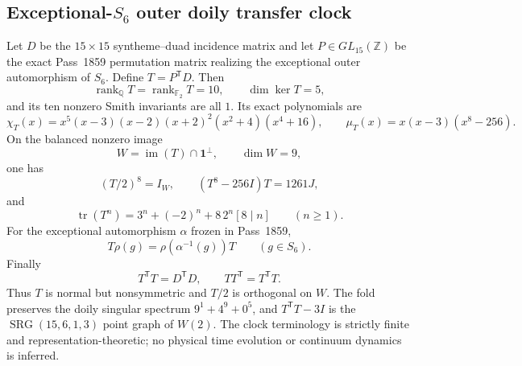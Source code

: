 \subsection{Exceptional-$S_6$ outer doily transfer clock}
Let $D$ be the $15\times15$ syntheme--duad incidence matrix and let
$P\in GL_{15}(\mathbb Z)$ be the exact Pass~1859 permutation matrix realizing
the exceptional outer automorphism of $S_6$. Define $T=P^{\mathsf T}D$.
Then
\[
 \operatorname{rank}_{\mathbb Q}T=
 \operatorname{rank}_{\mathbb F_2}T=10,
 \qquad \dim\ker T=5,
\]
and its ten nonzero Smith invariants are all $1$. Its exact polynomials are
\[
 \chi_T(x)=x^5(x-3)(x-2)(x+2)^2(x^2+4)(x^4+16),
 \qquad
 \mu_T(x)=x(x-3)(x^8-256).
\]
On the balanced nonzero image
\[
 W=\operatorname{im}(T)\cap\mathbf1^\perp,
 \qquad \dim W=9,
\]
one has
\[
 \boxed{(T/2)^8=I_W},
 \qquad
 (T^8-256I)T=1261J,
\]
and
\[
 \operatorname{tr}(T^n)=3^n+(-2)^n+8\,2^n[8\mid n]
 \qquad(n\ge1).
\]
For the exceptional automorphism $\alpha$ frozen in Pass~1859,
\[
 T\rho(g)=\rho(\alpha^{-1}(g))T
 \qquad(g\in S_6).
\]
Finally
\[
 T^{\mathsf T}T=D^{\mathsf T}D,
 \qquad
 TT^{\mathsf T}=T^{\mathsf T}T.
\]
Thus $T$ is normal but nonsymmetric and $T/2$ is orthogonal on $W$. The fold
preserves the doily singular spectrum $9^1+4^9+0^5$, and
$T^{\mathsf T}T-3I$ is the $\operatorname{SRG}(15,6,1,3)$ point graph of
$W(2)$. The clock terminology is strictly finite and representation-theoretic;
no physical time evolution or continuum dynamics is inferred.
